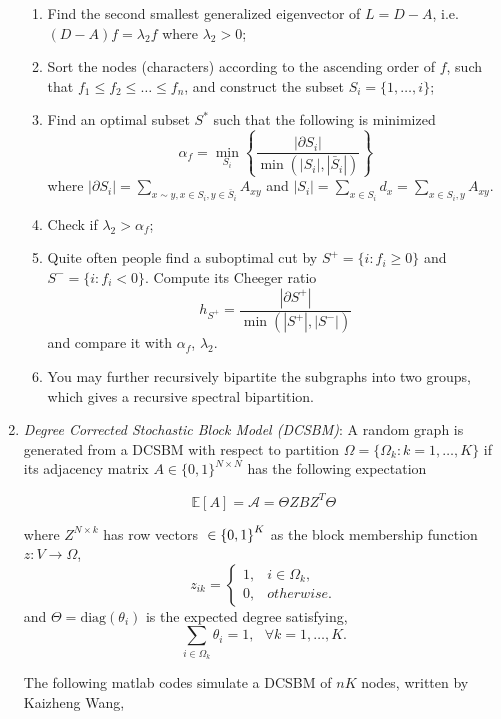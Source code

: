\documentclass[11pt]{article}
\def\A{{\mathcal A}}
\def\E{{\mathbb E}}
\def\diag{{\mathrm{diag}}}
\begin{document}
\begin{enumerate}
\begin{enumerate}
\item Find the second smallest generalized eigenvector of $L=D-A$, i.e. $(D-A)f = \lambda_2 f$ where $\lambda_2>0$;
\item Sort the nodes (characters) according to the ascending order of $f$, such that $f_1\leq f_2 \leq \ldots \leq f_n$, and construct the subset $S_i = \{1,\ldots, i\}$;
\item Find an optimal subset $S^\ast$ such that the following is minimized  
\[ \alpha_f = \min_{S_i} \left\{ \frac{|\partial S_i|} {\min(|S_i|, |\bar{S}_i|)} \right\}\]  
where $|\partial S_i|=\sum_{x\sim y, x\in S_i, y\in \bar{S}_i} A_{xy}$ and $|S_i|=\sum_{x\in S_i} d_x = \sum_{x\in S_i, y} A_{xy}$.  
\item Check if $\lambda_2 > \alpha_f$;
\item Quite often people find a suboptimal cut by $S^+=\{i: f_i \geq 0\}$ and $S^-=\{i: f_i <0\}$. Compute its Cheeger ratio
\[ h_{S^+} =  \frac{|\partial S^+|} {\min(|S^+|, |S^-|)} \]
and compare it with $\alpha_f$, $\lambda_2$. 
\item You may further recursively bipartite the subgraphs into two groups, which gives a recursive spectral bipartition. 
\end{enumerate} 

\item {\em Degree Corrected Stochastic Block Model (DCSBM)}: A random graph is generated from a DCSBM with respect to partition $\Omega=\{\Omega_k: k=1,\ldots,K\}$ if its adjacency matrix $A \in \{0,1\}^{N\times N}$ has the following expectation

\[ \E [A] = \A = \Theta Z B Z^T \Theta\]

where $Z^{N \times k}$ has row vectors $\thickspace \in {\{0,1\}}^K$ as the block membership function $z:V\to \Omega$,
\begin{equation*}
z_{ik}=
 \begin{cases}
    1,   &  i\in \Omega_k, \\
    0,   &  otherwise.
 \end{cases}
\end{equation*}
and $\Theta = \diag(\theta_i)$ is the expected degree satisfying,
\begin{equation*}
  \sum_{i\in \Omega_k}\theta_i=1, \ \ \ \forall k=1,\ldots,K.
\end{equation*}

The following matlab codes simulate a DCSBM of $n K$ nodes, written by Kaizheng Wang, 


\end{enumerate}
\end{document}

